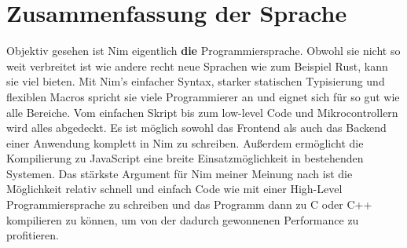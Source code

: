\documentclass[11pt]{report}
\begin{document}
\section{Zusammenfassung der Sprache}
Objektiv gesehen ist Nim eigentlich \textbf{die} Programmiersprache. Obwohl sie nicht so weit verbreitet ist wie andere recht neue Sprachen wie zum Beispiel Rust, kann sie viel bieten. Mit Nim's einfacher Syntax, starker statischen Typisierung und flexiblen Macros spricht sie viele Programmierer an und eignet sich für so gut wie alle Bereiche. Vom einfachen Skript bis zum low-level Code und Mikrocontrollern wird alles abgedeckt. Es ist möglich sowohl das Frontend als auch das Backend einer Anwendung komplett in Nim zu schreiben. Außerdem ermöglicht die Kompilierung zu JavaScript eine breite Einsatzmöglichkeit in bestehenden Systemen. Das stärkste Argument für Nim meiner Meinung nach ist die Möglichkeit relativ schnell und einfach Code wie mit einer High-Level Programmiersprache zu schreiben und das Programm dann zu C oder C++ kompilieren zu können, um von der dadurch gewonnenen Performance zu profitieren.
\end{document}
